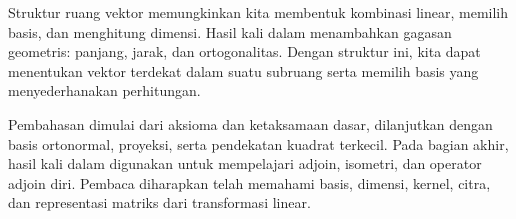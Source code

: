 Struktur ruang vektor memungkinkan kita membentuk kombinasi linear,
memilih basis, dan menghitung dimensi. Hasil kali dalam menambahkan
gagasan geometris: panjang, jarak, dan ortogonalitas. Dengan struktur
ini, kita dapat menentukan vektor terdekat dalam suatu subruang
serta memilih basis yang menyederhanakan perhitungan.

Pembahasan dimulai dari aksioma dan ketaksamaan dasar, dilanjutkan
dengan basis ortonormal, proyeksi, serta pendekatan kuadrat terkecil.
Pada bagian akhir, hasil kali dalam digunakan untuk mempelajari
adjoin, isometri, dan operator adjoin diri. Pembaca diharapkan telah
memahami basis, dimensi, kernel, citra, dan representasi matriks
dari transformasi linear.
